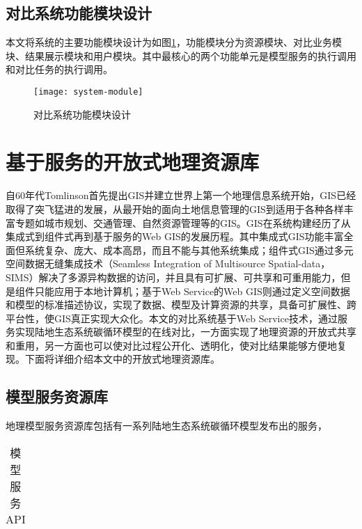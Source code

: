 \subsection{对比系统功能模块设计}
本文将系统的主要功能模块设计为如图\ref{fig:system-module}，功能模块分为资源模块、对比业务模块、结果展示模块和用户模块。其中最核心的两个功能单元是模型服务的执行调用和对比任务的执行调用。

\begin{figure}[!htbp]
    \centering
    \texttt{[image: system-module]}
    \caption{对比系统功能模块设计}
    \label{fig:system-module}
\end{figure}

\section{基于服务的开放式地理资源库}
自60年代Tomlinson首先提出GIS并建立世界上第一个地理信息系统开始，GIS已经取得了突飞猛进的发展，从最开始的面向土地信息管理的GIS到适用于各种各样丰富专题如城市规划、交通管理、自然资源管理等的GIS。GIS在系统构建经历了从集成式到组件式再到基于服务的Web GIS的发展历程。其中集成式GIS功能丰富全面但系统复杂、庞大、成本高昂，而且不能与其他系统集成；组件式GIS通过多元空间数据无缝集成技术（Seamless Integration of Multisource Spatial-data，SIMS）解决了多源异构数据的访问，并且具有可扩展、可共享和可重用能力，但是组件只能应用于本地计算机；基于Web Service的Web GIS则通过定义空间数据和模型的标准描述协议，实现了数据、模型及计算资源的共享，具备可扩展性、跨平台性，使GIS真正实现大众化。本文的对比系统基于Web Service技术，通过服务实现陆地生态系统碳循环模型的在线对比，一方面实现了地理资源的开放式共享和重用，另一方面也可以使对比过程公开化、透明化，使对比结果能够方便地复现。下面将详细介绍本文中的开放式地理资源库。

\subsection{模型服务资源库}
地理模型服务资源库包括有一系列陆地生态系统碳循环模型发布出的服务，

\begin{table}
    \centering
    \caption{模型服务API}
    \label{tab:model-service-API}
    \begin{threeparttable}
        \begin{tabu} to 1
            \toprule[1.5pt]
            \midrule[1.5pt]
            \bottomrule[1.5pt]
        \end{tabu}
    \end{threeparttable}
\end{table}

